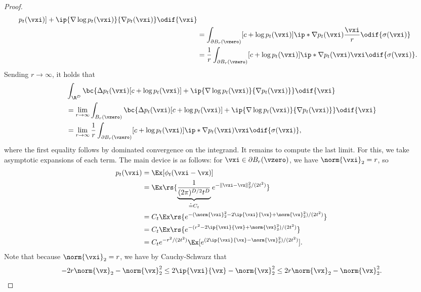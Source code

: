\documentclass[../../book-main.tex]{subfiles}
\begin{document}
\begin{proof}
\begin{align}
{            p_{t}(\vxi)] + \ip{\nabla \log p_{t}(\vxi)}{\nabla
        p_{t}(\vxi)}}\odif{\vxi} \\
        &= \int_{\partial B_{r}(\vzero)}[c + \log
        p_{t}(\vxi)]\ip*{\nabla
        p_{t}(\vxi)}{\frac{\vxi}{r}}\odif{\sigma(\vxi)} \\
        &= \frac{1}{r}\int_{\partial B_{r}(\vzero)}[c + \log
        p_{t}(\vxi)]\ip*{\nabla p_{t}(\vxi)}{\vxi}\odif{\sigma(\vxi)}.
    \end{align}
    Sending \(r \to \infty\), it holds that
    \begin{align}
        &\int_{\R^{D}}\bc{\Delta p_{t}(\vxi)[c + \log p_{t}(\vxi)] +
        \ip{\nabla \log p_{t}(\vxi)}{\nabla p_{t}(\vxi)}}\odif{\vxi}
        \label{eq:app_diffusion_r_infinity_limit} \\
        &= \lim_{r \to \infty}\int_{B_{r}(\vzero)}\bc{\Delta
            p_{t}(\vxi)[c + \log p_{t}(\vxi)] + \ip{\nabla \log
        p_{t}(\vxi)}{\nabla p_{t}(\vxi)}}\odif{\vxi} \\
        &= \lim_{r \to \infty}\frac{1}{r}\int_{\partial
        B_{r}(\vzero)}[c + \log p_{t}(\vxi)]\ip*{\nabla
        p_{t}(\vxi)}{\vxi}\odif{\sigma(\vxi)},
    \end{align}
    where the first equality follows by dominated convergence on
    the integrand. It remains to compute the last limit. For this, we
    take asymptotic expansions of each term. The main device is as
    follows: for \(\vxi \in \partial B_{r}(\vzero)\), we have
    \(\norm{\vxi}_{2} = r\), so
    \begin{align}
        p_{t}(\vxi)
        &= \Ex[\phi_{t}(\vxi - \vx)] \\
        &= \Ex\rs{\underbrace{\frac{1}{(2\pi)^{D/2}t^{D}}}_{\doteq
        C_{t}}e^{-\|\vxi - \vx\|_{2}^{2}/(2t^{2})}} \\
        &= C_{t}\Ex\rs{e^{-(\norm{\vxi}_{2}^{2} - 2\ip{\vxi}{\vx} +
        \norm{\vx}_{2}^{2})/(2t^{2})}} \\
        &= C_{t}\Ex\rs{e^{-(r^{2} - 2\ip{\vxi}{\vx} +
        \norm{\vx}_{2}^{2})/(2t^{2})}} \\
        &= C_{t}e^{-r^{2}/(2t^{2})}\Ex[e^{(2\ip{\vxi}{\vx} -
        \norm{\vx}_{2}^{2})/(2t^{2})}].
    \end{align}
    Note that because \(\norm{\vxi}_{2} = r\), we have by Cauchy-Schwarz that
    \begin{equation}
        -2r\norm{\vx}_{2} - \norm{\vx}_{2}^{2} \leq 2\ip{\vxi}{\vx} -
        \norm{\vx}_{2}^{2} \leq 2r\norm{\vx}_{2} - \norm{\vx}_{2}^{2}.

\end{equation}
\end{proof}
\end{document}
